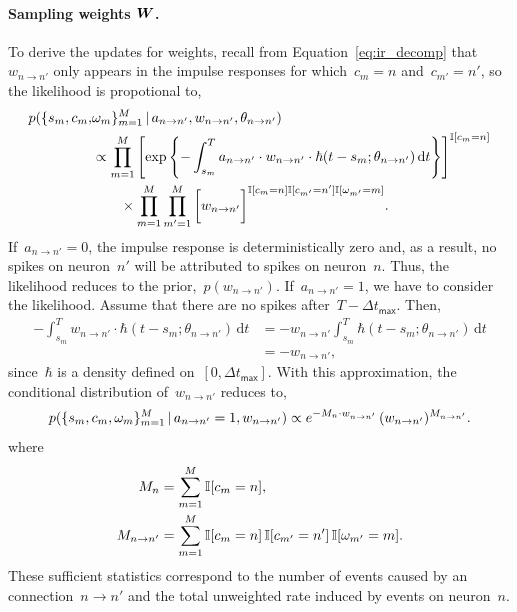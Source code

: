 \paragraph{Sampling weights $\boldsymbol{W}$.} 
To derive the updates for weights, recall from
Equation~\ref{eq:ir_decomp} that~${w_{n \to n'}}$ only
appears in the impulse responses for which~${c_m=n}$
and~${c_{m'}=n'}$, so the likelihood is propotional to,
\begin{align*}
  p(\{s_m,c_m, &\omega_m\}^M_{m=1} \,|\, a_{n \to n'}, w_{n \to n'}, 
  \theta_{n \to n'}) \\
  &\propto \prod_{m=1}^M\left[
    \exp\left\{-\int^T_{s_m} a_{n \to n'} \cdot w_{n \to n'} \cdot \hbar(t - s_m; \theta_{n \to n'}) \, \mathrm{d}t
    \right\} \right]^{\mathbb{I}[c_m=n]} \\
  &\qquad \times \prod_{m=1}^M \prod_{m'=1}^M \bigg[
    w_{n \to n'}\bigg]^{\mathbb{I}[c_{m}=n] \mathbb{I}[c_{m'}=n'] \mathbb{I}[\omega_{m'}=m]}.
\end{align*}
If~${a_{n \to n'}=0}$, the impulse response is deterministically zero
and, as a result, no spikes on neuron~$n'$ will be attributed to spikes
on neuron~$n$. Thus, the likelihood reduces to the prior,~$p(w_{n \to n'})$.
If~${a_{n \to n'}=1}$, we have to consider the likelihood.
Assume that there are no spikes after~${T-\Delta t_{\mathsf{max}}}$. Then,
\begin{align*}
  -\int^T_{s_m} w_{n \to n'} \cdot
  \hbar(t - s_m; \theta_{n \to n'}) \, \mathrm{d}t
  &= -w_{n \to n'}  \int^T_{s_m} \hbar(t - s_m; \theta_{n \to n'}) \, \mathrm{d}t \\
  &= - w_{n \to n'},
\end{align*}
since~$\hbar$ is a density defined on~$[0,\Delta t_{\mathsf{max}}]$.
With this approximation, the conditional distribution of~$w_{n \to n'}$
reduces to,
\begin{align*}
  p(\{s_m,c_m, \omega_m\}^M_{m=1} \,|\, a_{n \to n'}=1, w_{n \to n'}) 
  \propto 
  e^{-M_n \cdot w_{n \to n'}}  \,
  (w_{n \to n'})^{M_{n \to n'}}.
\end{align*}
where
\begin{align*}
  M_{n} &= \sum_{m=1}^M \mathbb{I}[c_{m}=n], \\
  M_{n \to n'} &= \sum_{m=1}^M \mathbb{I}[c_{m}=n] \, \mathbb{I}[c_{m'}=n'] \, \mathbb{I}[\omega_{m'}=m].
\end{align*}
These sufficient statistics correspond to the number of events caused
by an connection~${n \to n'}$ and the total unweighted rate induced by
events on neuron~$n$.

